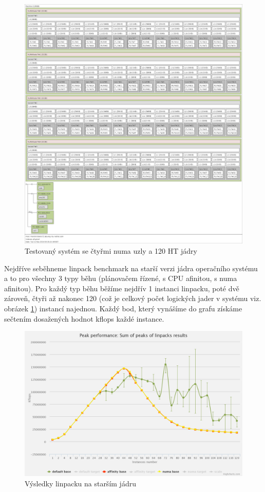 \documentclass[a4paper,12pt]{article}
\begin{document}
\begin{figure}[p]
\includegraphics[scale=0.2]{obrazky/lsTOPO-brickland.png}
\caption{Testovaný systém se čtyřmi numa uzly a 120 HT jádry}
\label{4 numa NODE system scheme}
\end{figure}

Nejdříve seběhneme linpack benchmark na starší verzi jádra operačního systému a to pro všechny 3 typy běhu (plánovačem řízené, s CPU afinitou, s numa afinitou). Pro každý typ běhu běžíme nejdřív 1 instanci linpacku, poté dvě zároveň, čtyři až nakonec 120 (což je celkový počet logických jader v systému viz. obrázek \ref{4 numa NODE system scheme}) instancí najednou. Každý bod, který vynášíme do grafu získáme sečtením dosažených hodnot kflops každé instance.

\begin{figure}[ht]
\center
\includegraphics[scale=0.16]{obrazky/LinpackBaseChart.png}
\caption{Výsledky linpacku na starším jádru}
\label{older kernel linpack results}
\end{figure}
\end{document}
